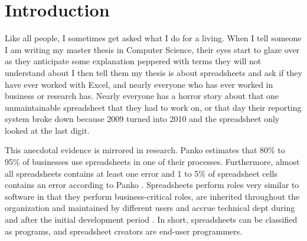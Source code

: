 \documentclass[12pt,a4paper,onecolumn,oneside]{memoir}
\begin{document}


\cleardoublepage

\tableofcontents*

\clearpage


\chapter{Introduction}

Like all people, I sometimes get asked what I do for a living.
When I tell someone I am writing my master thesis in Computer Science, their eyes start to glaze over as they anticipate some explanation peppered with terms they will not understand about 
I then tell them my thesis is about spreadsheets and ask if they have ever worked with Excel, and nearly everyone who has ever worked in business or research has.
Nearly everyone has a horror story about that one unmaintainable spreadsheet that they had to work on, or that day their reporting system broke down because 2009 turned into 2010 and the spreadsheet only looked at the last digit.

\vspace{0.3em}

This anecdotal evidence is mirrored in research.
Panko \cite{panko2006facing} estimates that 80\% to 95\% of businesses use spreadsheets in one of their processes.
Furthermore, almost all spreadsheets contains at least one error and 1 to 5\% of spreadsheet cells contains an error according to Panko \cite{panko1998we}.
Spreadsheets perform roles very similar to software in that they perform business-critical roles, are inherited throughout the organization and maintained by different users and accrue technical dept during and after the initial development period \cite{panko1998we}.
In short, spreadsheets can be classified as programs, and spreadsheet creators are end-user programmers.

\vspace{0.3em}
\end{document}
